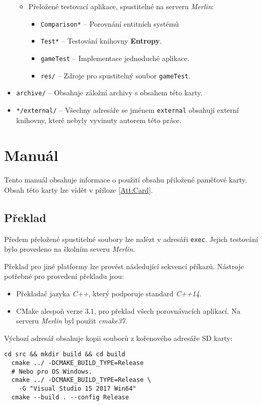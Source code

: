 \begin{itemize}
\begin{itemize}
		\item Přeložené testovací aplikace, spustitelné na serveru \emph{Merlin}:
		\begin{itemize}
			\item \texttt{Comparison*} -- Porovnání entitních systémů
			\item \texttt{Test*} -- Testování knihovny \textbf{Entropy}.
			\item \texttt{gameTest} -- Implementace jednoduché aplikace.
			\item \texttt{res/} -- Zdroje pro spustitelný soubor \texttt{gameTest}.
		\end{itemize}
	\end{itemize}
	\item \texttt{archive/} -- Obsahuje záložní archivy s obsahem této karty.
	\item \texttt{*/external/} -- Všechny adresáře se jménem \texttt{external} obsahují externí knihovny, které nebyly vyvinuty autorem této práce.
\end{itemize}

\chapter{Manuál}
Tento manuál obsahuje informace o použití obsahu přiložené paměťové karty. Obsah této karty lze vidět v příloze \ref{Att:Card}.

\section*{Překlad}
Předem přeložené spustitelné soubory lze nalézt v adresáři \texttt{exec}. Jejich testování bylo provedeno na školním severu \emph{Merlin}.

Překlad pro jiné platformy lze provést následující sekvencí příkazů. Nástroje potřebné pro provedení překladu jsou:
\begin{itemize}
	\item Překladač jazyka \emph{C++}, který podporuje standard \emph{C++14}.
	\item CMake alespoň verze 3.1, pro překlad všech porovnávacích aplikací. Na serveru \emph{Merlin} byl použit \emph{cmake37}.
\end{itemize}
\noindent Výchozí adresář obsahuje kopii souborů z kořenového adresáře SD karty:
\begin{lstlisting}[basicstyle=\ttfamily]
  cd src && mkdir build && cd build
  cmake ../ -DCMAKE_BUILD_TYPE=Release
  # Nebo pro OS Windows.
  cmake ../ -DCMAKE_BUILD_TYPE=Release \
    -G "Visual Studio 15 2017 Win64"
  cmake --build . --config Release
\end{lstlisting}

